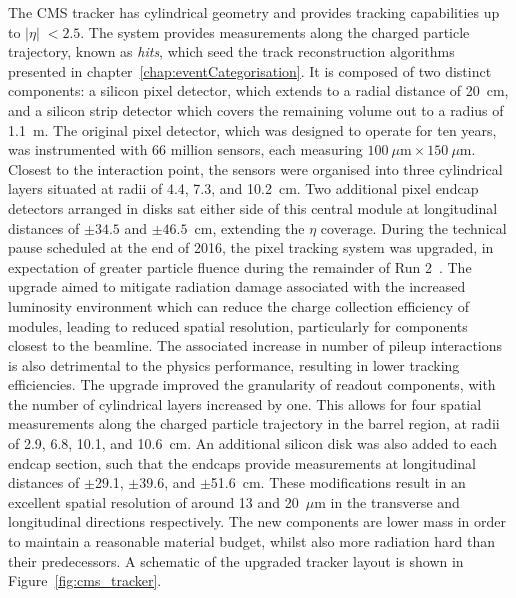 The CMS tracker has cylindrical geometry and provides tracking capabilities up to $|\eta|\;<2.5$.
The system provides measurements along the charged particle trajectory, known as \textit{hits}, which seed the track reconstruction algorithms presented in chapter~\ref{chap:eventCategorisation}.
It is composed of two distinct components: a silicon pixel detector, which extends to a radial distance of 20~cm, and a silicon strip detector which covers the remaining volume out to a radius of 1.1~m. 
The original pixel detector, which was designed to operate for ten years, was instrumented with 66 million sensors, each measuring $100~\mu\mathrm{m}\times150~\mu\mathrm{m}$. Closest to the interaction point, the sensors were organised into three cylindrical layers situated at radii of 4.4, 7.3, and 10.2~cm. Two additional pixel endcap detectors arranged in disks sat either side of this central module at longitudinal distances of $\pm34.5$ and $\pm46.5$~cm, extending the $\eta$ coverage. During the technical pause scheduled at the end of 2016, the pixel tracking system was upgraded, in expectation of greater particle fluence during the remainder of Run 2~\cite{CMS_phase1_tracker_upgrade}. The upgrade aimed to mitigate radiation damage associated with the increased luminosity environment which can reduce the charge collection efficiency of modules, leading to reduced spatial resolution, particularly for components closest to the beamline. The associated increase in number of pileup interactions is also detrimental to the physics performance, resulting in lower tracking efficiencies. The upgrade improved the granularity of readout components, with the number of cylindrical layers increased by one. This allows for four spatial measurements along the charged particle trajectory in the barrel region, at radii of 2.9, 6.8, 10.1, and 10.6~cm. An additional silicon disk was also added to each endcap section, such that the endcaps provide measurements at longitudinal distances of $\pm$29.1, $\pm$39.6, and $\pm$51.6~cm. These modifications result in an excellent spatial resolution of around 13 and 20~$\mu\mathrm{m}$ in the transverse and longitudinal directions respectively. The new components are lower mass in order to maintain a reasonable material budget, whilst also more radiation hard than their predecessors. A schematic of the upgraded tracker layout is shown in Figure~\ref{fig:cms_tracker}. %

